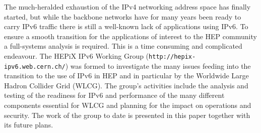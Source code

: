 The much-heralded exhaustion of the IPv4 networking address space has finally started,
but while the backbone networks have for many years been ready to carry IPv6 traffic there is still a well-known lack of 
applications using IPv6.
To ensure a smooth transition for the applications of interest to the HEP community a full-systems analysis 
is required. This is a time consuming and complicated endeavour.
The HEPiX IPv6 Working Group ({\tt http://hepix-ipv6.web.cern.ch/}) was formed to investigate the many issues feeding into the 
transition to the use of IPv6 in HEP and in particular by the Worldwide Large Hadron Collider Grid (WLCG). 
The group's activities include the analysis and testing of the readiness for IPv6 and 
performance of the many different components essential for WLCG and planning for the impact on 
operations and security. The work of the group to date is presented in this paper together with its future plans.
